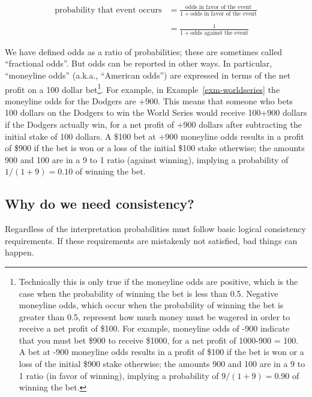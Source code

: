 \documentclass[
  letterpaper,
  DIV=11,
  numbers=noendperiod]{scrreprt}
\theoremstyle{plain}
\theoremstyle{definition}
\theoremstyle{definition}
\theoremstyle{definition}
\theoremstyle{remark}
\begin{document}
\begin{align*}
\text{probability that event occurs} & = \frac{\text{odds in favor of the event}}{1+\text{odds in favor of the event}}\\
& \\
& = \frac{1}{1+\text{odds against the event}}
\end{align*}

We have defined odds as a ratio of probabilities; these are sometimes
called ``fractional odds''. But odds can be reported in other ways. In
particular, ``moneyline odds'' (a.k.a., ``American odds'') are expressed
in terms of the net profit on a 100 dollar bet\footnote{Technically this
  is only true if the moneyline odds are positive, which is the case
  when the probability of winning the bet is less than 0.5. Negative
  moneyline odds, which occur when the probability of winning the bet is
  greater than 0.5, represent how much money must be wagered in order to
  receive a net profit of \$100. For example, moneyline odds of -900
  indicate that you must bet \$900 to receive \$1000, for a net profit
  of 1000-900 = 100. A bet at -900 moneyline odds results in a profit of
  \$100 if the bet is won or a loss of the initial \$900 stake
  otherwise; the amounts 900 and 100 are in a 9 to 1 ratio (in favor of
  winning), implying a probability of \(9/(1+9) = 0.90\) of winning the
  bet.}. For example, in Example~\ref{exm-worldseries} the moneyline
odds for the Dodgers are +900. This means that someone who bets 100
dollars on the Dodgers to win the World Series would receive 100+900
dollars if the Dodgers actually win, for a net profit of +900 dollars
after subtracting the initial stake of 100 dollars. A \$100 bet at +900
moneyline odds results in a profit of \$900 if the bet is won or a loss
of the initial \$100 stake otherwise; the amounts 900 and 100 are in a 9
to 1 ratio (against winning), implying a probability of
\(1/(1+9) = 0.10\) of winning the bet.

\subsection{Why do we need
consistency?}\label{why-do-we-need-consistency}

Regardless of the interpretation probabilities must follow basic logical
consistency requirements. If these requirements are mistakenly not
satisfied, bad things can happen.
\end{document}
